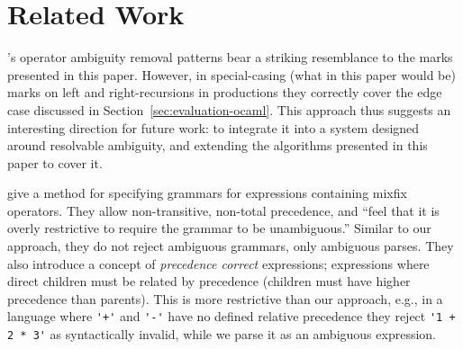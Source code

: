 \documentclass[acmsmall,review,anonymous]{acmart}\settopmatter{printfolios=true,printccs=false,printacmref=false}
\newcommand{\ocaml}{\lstinline[language={[objective]caml}]}
\begin{document}


\section{Related Work}

\citet{afroozehSafeSpecificationOperator2013}'s operator ambiguity removal patterns bear a striking resemblance to the marks presented in this paper. However, in special-casing (what in this paper would be) marks on left and right-recursions in productions they correctly cover the edge case discussed in Section~\ref{sec:evaluation-ocaml}. This approach thus suggests an interesting direction for future work: to integrate it into a system designed around resolvable ambiguity, and extending the algorithms presented in this paper to cover it.

\citet{danielssonParsingMixfixOperators2011} give a method for specifying grammars for expressions containing mixfix operators. They allow non-transitive, non-total precedence, and ``feel that it is overly restrictive to require the grammar to be unambiguous.'' Similar to our approach, they do not reject ambiguous grammars, only ambiguous parses. They also introduce a concept of \emph{precedence correct} expressions; expressions where direct children must be related by precedence (children must have higher precedence than parents). This is more restrictive than our approach, e.g., in a language where \verb|'+'| and \verb|'-'| have no defined relative precedence they reject \verb|'1 + 2 * 3'| as syntactically invalid, while we parse it as an ambiguous expression.
\end{document}
